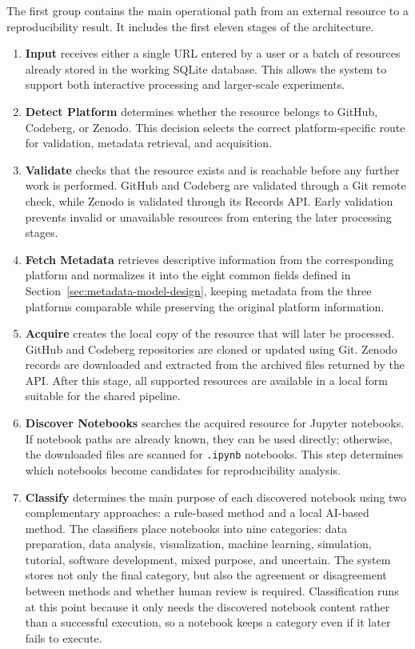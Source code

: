 The first group contains the main operational path from an external resource to a reproducibility result. It includes the first eleven stages of the architecture.

\begin{enumerate}[label=\arabic*.,leftmargin=1.2cm,itemsep=0.25em,topsep=0.2em]
\item \textbf{Input} receives either a single URL entered by a user or a batch of resources already stored in the working SQLite database. This allows the system to support both interactive processing and larger-scale experiments.
\item \textbf{Detect Platform} determines whether the resource belongs to GitHub, Codeberg, or Zenodo. This decision selects the correct platform-specific route for validation, metadata retrieval, and acquisition.
\item \textbf{Validate} checks that the resource exists and is reachable before any further work is performed. GitHub and Codeberg are validated through a Git remote check, while Zenodo is validated through its Records API. Early validation prevents invalid or unavailable resources from entering the later processing stages.
\item \textbf{Fetch Metadata} retrieves descriptive information from the corresponding platform and normalizes it into the eight common fields defined in Section~\ref{sec:metadata-model-design}, keeping metadata from the three platforms comparable while preserving the original platform information.
\item \textbf{Acquire} creates the local copy of the resource that will later be processed. GitHub and Codeberg repositories are cloned or updated using Git. Zenodo records are downloaded and extracted from the archived files returned by the API. After this stage, all supported resources are available in a local form suitable for the shared pipeline.
\item \textbf{Discover Notebooks} searches the acquired resource for Jupyter notebooks. If notebook paths are already known, they can be used directly; otherwise, the downloaded files are scanned for \texttt{.ipynb} notebooks. This step determines which notebooks become candidates for reproducibility analysis.
\item \textbf{Classify} determines the main purpose of each discovered notebook using two complementary approaches: a rule-based method and a local AI-based method. The classifiers place notebooks into nine categories: data preparation, data analysis, visualization, machine learning, simulation, tutorial, software development, mixed purpose, and uncertain. The system stores not only the final category, but also the agreement or disagreement between methods and whether human review is required. Classification runs at this point because it only needs the discovered notebook content rather than a successful execution, so a notebook keeps a category even if it later fails to execute.

\end{enumerate}
